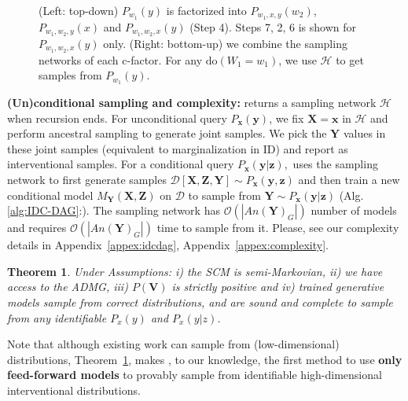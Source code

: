\documentclass{article}
\newcommand{\h}{\mathcal{H}}
\newcommand{\x}{\mathbf{x}}
\newcommand{\y}{\mathbf{y}}
\newcommand{\X}{\mathbf{X}}
\newcommand{\Y}{\mathbf{Y}}
\newcommand{\V}{\mathbf{V}}
\newcommand{\mbf}{\mathbf}
\newcommand{\Do}{\text{do}}
\newcommand{\data}{\mathcal{D}}
\newcommand{\idgen}{\text{ID-GEN}\xspace}
\newcommand{\idcdag}{\text{IDC-GEN}\xspace}
\theoremstyle{plain}
\newtheorem{theorem}{Theorem}[section]
\theoremstyle{definition}
\theoremstyle{remark}
\begin{document}
\begin{figure}[t!]
\begin{subfigure}[c]{0.48\linewidth}
\begin{subfigure}[c]{.49\linewidth}
  \end{subfigure}
  \label{fig:merge-networks}
  \end{subfigure}
  \caption{
(Left: top-down) 
%
$P_{w_1}(y)$ is factorized into $P_{w_1, x,y }(w_2)$, $P_{w_1, w_2, y}(x)$ and $P_{w_1,  w_2, x}(y)$ (Step 4). Steps 7, 2, 6 is shown for $P_{w_1,  w_2, x}(y)$ only.
%
%
(Right: bottom-up)  we combine the sampling networks of 
 each c-factor.
For any $\Do(W_1=w_1)$, 
we use $\h$ to get samples from $P_{w_1}(y)$.
}
\label{fig:alg-simulation}
\vspace{-3mm}
\end{figure}
%

\textbf{(Un)conditional sampling and complexity:}
\idgen returns a sampling network $\h$ when recursion ends. For unconditional query $P_{\x}(\y)$, we fix $\X=\x$ in $\h$ and perform ancestral sampling to generate joint samples. We pick the $\Y$ values in these joint samples (equivalent to marginalization in ID) and report as interventional samples.
For a conditional query $P_{\x}({\y}|{\mbf{z}}),$ \idgen uses the sampling network to first generate samples $\data[\X, \mbf{Z}, \Y]\sim P_{\x}(\y,\mbf{z})$ and then train a new conditional model $M_{\Y}(\X,\mbf{Z})$ on $\data$ to sample from $\Y\sim P_{\x}(\y|\mbf{z})$ (Alg.\ref{alg:IDC-DAG}:\idcdag).
The sampling network has $\mathcal{O}(|An(\Y)_{G}|)$ number of models and requires $\mathcal{O}(|An(\Y)_{G}|)$ time to sample from it. Please, see our complexity details in Appendix~\ref{appex:idcdag}, Appendix~\ref{appex:complexity}.
%
%
%
\begin{theorem}
	\label{th:sound-complete}
 Under Assumptions:
 i) the SCM is semi-Markovian, ii) we have access to the ADMG, iii) $P(\V)$ is strictly positive and  iv) trained  generative models sample from correct distributions, \idgen and {\idcdag} are sound and complete to sample from any identifiable $P_x(y)$ and $P_{x}(y|z)$.
\end{theorem}
Note that although existing work can sample from (low-dimensional) distributions, Theorem~\ref{th:sound-complete}, makes \idgen, to our knowledge, the first method to use \textbf{only feed-forward models} to provably
sample from identifiable high-dimensional interventional distributions.
%
%
%
%
%
%
\end{document}
